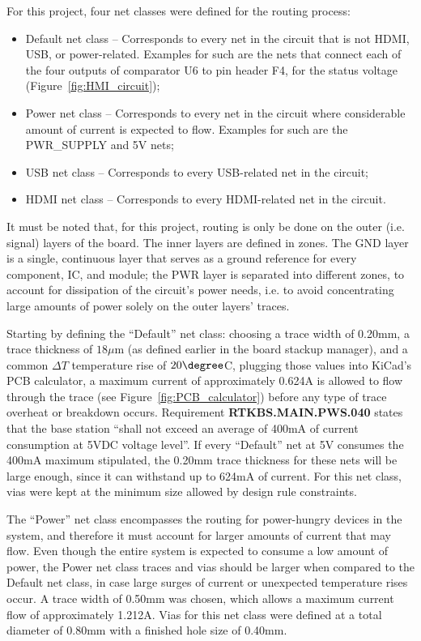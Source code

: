 For this project, four net classes were defined for the routing process:

\begin{itemize}
	\item Default net class -- Corresponds to every net in the circuit that is not HDMI, USB, or power-related. Examples for such are the nets that connect each of the four outputs of comparator U6 to pin header F4, for the status voltage (Figure~\ref{fig:HMI_circuit});
	
	\item Power net class -- Corresponds to every net in the circuit where considerable amount of current is expected to flow. Examples for such are the PWR\_SUPPLY and 5V nets;
	
	\item USB net class -- Corresponds to every USB-related net in the circuit;
	
	\item HDMI net class -- Corresponds to every HDMI-related net in the circuit.
\end{itemize}

It must be noted that, for this project, routing is only be done on the outer (i.e. signal) layers of the board. The inner layers are defined in zones. The GND layer is a single, continuous layer that serves as a ground reference for every component, IC, and module; the PWR layer is separated into different zones, to account for dissipation of the circuit's power needs, i.e. to avoid concentrating large amounts of power solely on the outer layers' traces.

Starting by defining the ``Default'' net class: choosing a trace width of 0.20mm, a trace thickness of $18 \mu$m (as defined earlier in the board stackup manager), and a common $\Delta T$ temperature rise of $20 \degree$C, plugging those values into KiCad's PCB calculator, a maximum current of approximately 0.624A is allowed to flow through the trace (see Figure~\ref{fig:PCB_calculator}) before any type of trace overheat or breakdown occurs. Requirement \textbf{RTKBS.MAIN.PWS.040} states that the base station ``shall not exceed an average of 400mA of current consumption at 5VDC voltage level''. If every ``Default'' net at 5V consumes the 400mA maximum stipulated, the 0.20mm trace thickness for these nets will be large enough, since it can withstand up to 624mA of current. For this net class, vias were kept at the minimum size allowed by design rule constraints.

The ``Power'' net class encompasses the routing for power-hungry devices in the system, and therefore it must account for larger amounts of current that may flow. Even though the entire system is expected to consume a low amount of power, the Power net class traces and vias should be larger when compared to the Default net class, in case large surges of current or unexpected temperature rises occur. A trace width of 0.50mm was chosen, which allows a maximum current flow of approximately 1.212A. Vias for this net class were defined at a total diameter of 0.80mm with a finished hole size of 0.40mm.

